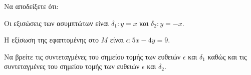 \begin{alist}
\item Να αποδείξετε ότι:
    \begin{rlist}
    \item Οι εξισώσεις των ασυμπτώτων είναι $\delta_1: y = x$ και $\delta_2: y = -x$. 
    \item Η εξίσωση της εφαπτομένης στο $M$ είναι $\epsilon: 5x - 4y = 9$. 
    \end{rlist}
\item Να βρείτε τις συντεταγμένες του σημείου τομής των ευθειών $\epsilon$ και $\delta_1$ καθώς και τις συντεταγμένες του σημείου τομής των ευθειών $\epsilon$ και $\delta_2$. 
\end{alist}
